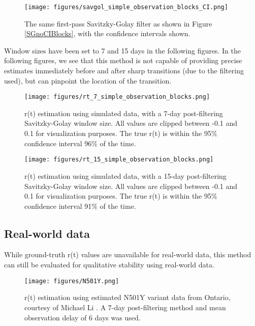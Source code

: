 \documentclass{article}
\begin{document}
{\begin{figure}[h!]
\centering
\texttt{[image: figures/savgol\_simple\_observation\_blocks\_CI.png]}
\caption{The same first-pass Savitzky-Golay filter as shown in Figure \ref{SGnoCIBlocks}, with the confidence intervals shown.} 

\end{figure}

Window sizes have been set to 7 and 15 days in the following figures. In the following figures, we see that this method is not capable of providing precise estimates immediately before and after sharp transitions (due to the filtering used), but can pinpoint the location of the transition.


\begin{figure}[h!]
\centering
\texttt{[image: figures/rt\_7\_simple\_observation\_blocks.png]}
\caption{r(t) estimation using simulated data, with a 7-day post-filtering Savitzky-Golay window size. All values are clipped between -0.1 and 0.1 for visualization purposes. The true r(t) is within the 95\% confidence interval 96\% of the time.}
\end{figure}

\clearpage
\begin{figure}[h!]
\centering
\texttt{[image: figures/rt\_15\_simple\_observation\_blocks.png]}
\caption{r(t) estimation using simulated data, with a 15-day post-filtering Savitzky-Golay window size. All values are clipped between -0.1 and 0.1 for visualization purposes. The true r(t) is within the 95\% confidence interval 91\% of the time.}
\end{figure}




\subsection{Real-world data}
While ground-truth r(t) values are unavailable for real-world data, this method can still be evaluated for qualitative stability using real-world data. 

\clearpage

\begin{figure}[h!]
\centering
\texttt{[image: figures/N501Y.png]}
\caption{r(t) estimation using estimated N501Y variant data from Ontario, courtesy of Michael Li \cite{mli}. A 7-day post-filtering method and mean observation delay of 6 days was used.}

\end{figure}

}
\end{document}
